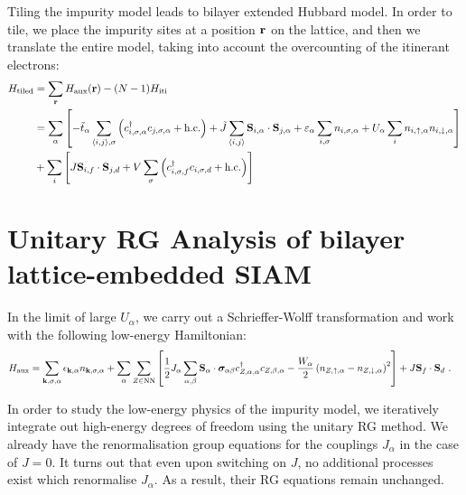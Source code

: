 \documentclass[%
reprint,
superscriptaddress,
groupedaddress,
superscriptaddress,
onecolumn,
]{revtex4-2}
\begin{document}
Tiling the impurity model leads to bilayer extended Hubbard model. In order to tile, we place the impurity sites at a position \({\bf r}\) on the lattice, and then we translate the entire model, taking into account the overcounting of the itinerant electrons:
\begin{equation}\begin{aligned}
	H_\text{tiled} &= \sum_{{\bf r}}H_\text{aux}({\bf r}) - (N-1) H_\text{iti} \\
	&= \sum_\alpha\left[-\tilde t_\alpha\sum_{\braket{i,j},\sigma}\left(c^\dagger_{i,\sigma,\alpha}c_{j,\sigma,\alpha} + \text{h.c.}\right) + \tilde J \sum_{\braket{i,j}}{\bf S}_{i,\alpha} \cdot {\bf S}_{j,\alpha} + \varepsilon_\alpha \sum_{i,\sigma}n_{i,\sigma,\alpha} + U_\alpha \sum_i n_{i,\uparrow,\alpha}n_{i,\downarrow,\alpha} \right] \\
	 &+ \sum_i \left[J {\bf S}_{i,f} \cdot {\bf S}_{j,d} + V\sum_\sigma\left(c^\dagger_{i,\sigma,f}c_{i,\sigma,d} + \text{h.c.}\right) \right]	
\end{aligned}\end{equation}

\section{Unitary RG Analysis of bilayer lattice-embedded SIAM}
In the limit of large \(U_\alpha\), we carry out a Schrieffer-Wolff transformation and work with the following low-energy Hamiltonian:
\begin{equation}\begin{aligned}
	H_\text{aux} &= \sum_{{\bf k},\sigma,\alpha}\epsilon_{{\bf k},\alpha}n_{{\bf k},\sigma,\alpha} + \sum_\alpha\sum_{Z \in \text{NN}}\left[\frac{1}{2}J_\alpha\sum_{\alpha,\beta}{\bf S}_\alpha \cdot {\boldsymbol{\sigma}}_{\alpha\beta}c^\dagger_{Z,\alpha,\alpha}c_{Z,\beta,\alpha} - \frac{W_\alpha}{2} \left(n_{Z,\uparrow,\alpha} - n_{Z,\downarrow,\alpha}\right)^2\right] + J{\bf S}_f \cdot {\bf S}_d~.
\end{aligned}\end{equation}

In order to study the low-energy physics of the impurity model, we iteratively integrate out high-energy degrees of freedom using the unitary RG method. We already have the renormalisation group equations for the couplings \(J_\alpha\) in the case of \(J=0\). It turns out that even upon switching on \(J\), no additional processes exist which renormalise \(J_\alpha\). As a result, their RG equations remain unchanged.
\end{document}
